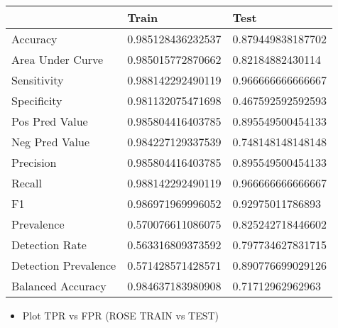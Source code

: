 \documentclass[
]{article}
\providecommand{\tightlist}{%
  \setlength{\itemsep}{0pt}\setlength{\parskip}{0pt}}
\begin{document}
\begin{table}[H]
\centering
\begin{tabular}{l|l|l}
\hline
  & Train & Test\\
\hline
Accuracy & 0.985128436232537 & 0.879449838187702\\
\hline
Area Under Curve & 0.985015772870662 & 0.82184882430114\\
\hline
Sensitivity & 0.988142292490119 & 0.966666666666667\\
\hline
Specificity & 0.981132075471698 & 0.467592592592593\\
\hline
Pos Pred Value & 0.985804416403785 & 0.895549500454133\\
\hline
Neg Pred Value & 0.984227129337539 & 0.748148148148148\\
\hline
Precision & 0.985804416403785 & 0.895549500454133\\
\hline
Recall & 0.988142292490119 & 0.966666666666667\\
\hline
F1 & 0.986971969996052 & 0.92975011786893\\
\hline
Prevalence & 0.570076611086075 & 0.825242718446602\\
\hline
Detection Rate & 0.563316809373592 & 0.797734627831715\\
\hline
Detection Prevalence & 0.571428571428571 & 0.890776699029126\\
\hline
Balanced Accuracy & 0.984637183980908 & 0.71712962962963\\
\hline
\end{tabular}
\end{table}

\begin{itemize}
\tightlist
\item
  Plot TPR vs FPR (ROSE TRAIN vs TEST)
\end{itemize}
\end{document}
